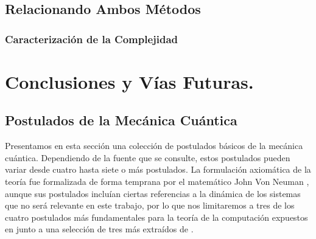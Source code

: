 \documentclass[11pt, spanish]{report}
\numberwithin{equation}{section}
\numberwithin{defin}{section}
\begin{document}
\section{Relacionando Ambos Métodos}
\subsection{Caracterización de la Complejidad}

\chapter{Conclusiones y Vías Futuras.}

%
%
%

\begin{appendices}


\chapter[Postulados de la Mecánica Cuántica]{Postulados de la Mecánica Cuántica\raisebox{.3\baselineskip}{\normalsize\footnotemark}}\label{Postulados}


Presentamos en esta sección una colección de postulados básicos de la mecánica cuántica. Dependiendo de la fuente que se consulte, estos postulados pueden variar desde cuatro hasta siete o más postulados. La formulación axiomática de la teoría fue formalizada de forma temprana por el matemático John Von Neuman \small{\cite{von2018mathematical}}, aunque sus postulados incluían ciertas referencias a la dinámica de los sistemas que no será relevante en este trabajo, por lo que nos limitaremos a tres de los cuatro postulados más fundamentales para la teoría de la computación expuestos en \small{\cite{nielsen2002quantum}} junto a una selección de tres más extraídos de \small{\cite{postus}}.


\end{appendices}
\end{document}
